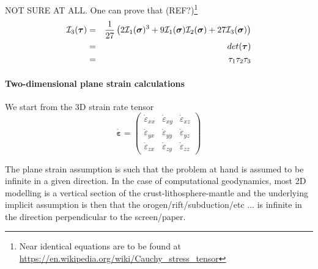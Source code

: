 \vspace{1cm}

{\color{gray} 
NOT SURE AT ALL. One can prove that (REF?)\footnote{Near identical equations are to be found at 
\url{https://en.wikipedia.org/wiki/Cauchy_stress_tensor}} 
\begin{eqnarray}
{\cal I}_3({\bm \tau}) 
&=& \frac{1}{27} \left( 2 {\cal I}_1({\bm \sigma})^3 + 
9 {\cal I}_1({\bm \sigma}) {\cal I}_2({\bm \sigma}) 
+27 {\cal I}_3({\bm \sigma})   \right) \nonumber\\
&=& det ({\bm\tau}) \nonumber\\
&=& \tau_1 \tau_2\tau_3 \nonumber\\
\end{eqnarray}
}

\paragraph{Two-dimensional plane strain calculations} 



We start from the 3D strain rate tensor 
\[
\dot{\bm \varepsilon} = 
\left(
\begin{array}{ccc}
\dot{\varepsilon}_{xx} & \dot{\varepsilon}_{xy} & \dot{\varepsilon}_{xz} \\
\dot{\varepsilon}_{yx} & \dot{\varepsilon}_{yy} & \dot{\varepsilon}_{yz} \\
\dot{\varepsilon}_{zx} & \dot{\varepsilon}_{zy} & \dot{\varepsilon}_{zz} 
\end{array}
\right)
\]

The plane strain assumption is such that the problem at hand is assumed to be infinite in a given direction. 
In the case of computational geodynamics, most 2D modelling is a vertical section of the crust-lithosphere-mantle
and the underlying implicit assumption is then that the orogen/rift/subduction/etc ... is infinite in the 
direction perpendicular to the screen/paper.  

